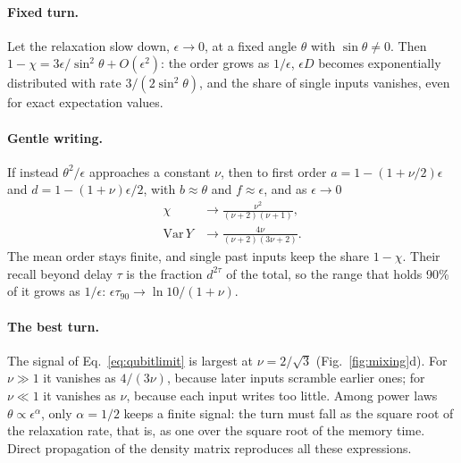 \paragraph{Fixed turn.}
Let the relaxation slow down, $\epsilon\to0$, at a fixed angle $\theta$ with $\sin\theta\neq0$. Then
$1-\chi=3\epsilon/\sin^2\theta+O(\epsilon^2)$: the order grows as $1/\epsilon$, $\epsilon D$ becomes exponentially
distributed with rate $3/(2\sin^2\theta)$, and the share of single inputs vanishes, even for exact expectation values.

\paragraph{Gentle writing.}
If instead $\theta^2/\epsilon$ approaches a constant $\nu$, then to first order $a=1-(1+\nu/2)\epsilon$ and
$d=1-(1+\nu)\epsilon/2$, with $b\approx\theta$ and $f\approx\epsilon$, and as $\epsilon\to0$
\begin{equation}
  \begin{aligned}
    \chi&\to\frac{\nu^2}{(\nu+2)(\nu+1)},\\
    \mathrm{Var}\,Y&\to\frac{4\nu}{(\nu+2)(3\nu+2)} .
  \end{aligned}
  \label{eq:qubitlimit}
\end{equation}
The mean order stays finite, and single past inputs keep the share $1-\chi$. Their recall beyond delay $\tau$ is the
fraction $d^{2\tau}$ of the total, so the range that holds 90\% of it grows as $1/\epsilon$:
$\epsilon\tau_{90}\to\ln10/(1+\nu)$.

\paragraph{The best turn.}
The signal of Eq.~\eqref{eq:qubitlimit} is largest at $\nu=2/\sqrt3$ (Fig.~\ref{fig:mixing}d). For $\nu\gg1$ it
vanishes as $4/(3\nu)$, because later inputs scramble earlier ones; for $\nu\ll1$ it vanishes as $\nu$, because each input writes too
little. Among power laws $\theta\propto\epsilon^\alpha$, only $\alpha=1/2$ keeps a finite signal: the turn must fall as
the square root of the relaxation rate, that is, as one over the square root of the memory time. Direct propagation
of the density matrix reproduces all these expressions.

